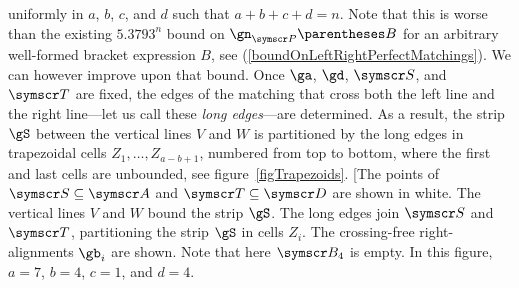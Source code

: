 uniformly in $a$, $b$, $c$, and $d$ such that $a+b+c+d=n$.
Note that this is worse than the existing $5.3793^n$ bound on $\gn_{\pointset P}\of{B}$ for an arbitrary
well-formed bracket expression $B$, see (\ref{boundOnLeftRightPerfectMatchings}).
\label{ImprovingBinomial}
We can however improve upon that bound. Once $\ga$, $\gd$, $\pointset S$, and $\pointset T$
are fixed, the edges of the matching that cross both the left line
and the right line---let us call these \emph{long edges}---are determined.
As a result,
the strip $\gS$ between the vertical lines $V$ and $W$ is partitioned by the long edges in trapezoidal cells
$Z_1,\dotsc,Z_{a-b+1}$, numbered from top to bottom, where the first and last cells are
unbounded, see figure~\ref{figTrapezoids}.
\marginfig[The points of $\pointset S\Subset \pointset A$ and
$\pointset T\Subset \pointset D$ are shown in white.
The vertical lines $V$ and $W$ bound the strip $\gS$.
The long edges join $\pointset S$ and
$\pointset T$, partitioning the strip $\gS$ in cells $Z_i$.
The crossing-free right-alignments $\gb_i$ are shown.
Note that here $\pointset B_4$ is empty.
In this figure, $a=7$, $b=4$, $c=1$, and $d=4$.
